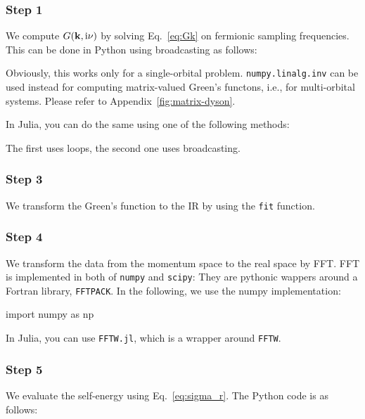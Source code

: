 \documentclass[submission, LectureNotes]{SciPost}
\newcommand{\bk}{\ensuremath{{\bf k}}}
\newcommand\ii{\mathrm{i}}%
\newcommand\iv{\ii\nu}%
\begin{document}
\subsubsection{Step 1}
We compute $G(\bk, \iv)$ by solving Eq.~\eqref{eq:Gk} on fermionic sampling frequencies.
This can be done in Python using broadcasting as follows:
\begin{python}
\end{python}
Obviously, this works only for a single-orbital problem.
\texttt{numpy.linalg.inv} can be used instead for computing matrix-valued Green's functons, i.e., for multi-orbital systems.
Please refer to Appendix~\ref{fig:matrix-dyson}.

In Julia, you can do the same using one of the following methods:

The first uses loops, the second one uses broadcasting.

\subsubsection{Step 3}
We transform the Green's function to the IR by using the \texttt{fit} function.


\subsubsection{Step 4}
We transform the data from the momentum space to the real space by FFT.
FFT is implemented in both of \texttt{numpy} and \texttt{scipy}:
They are pythonic wappers around a Fortran library, \texttt{FFTPACK}.
In the following, we use the numpy implementation:
\begin{python}
import numpy as  np    
\end{python}

In Julia, you can use \texttt{FFTW.jl}, which is a wrapper around \texttt{FFTW}.
%

\subsubsection{Step 5}
We evaluate the self-energy using Eq.~\eqref{eq:sigma_r}.
The Python code is as follows:
\end{document}
